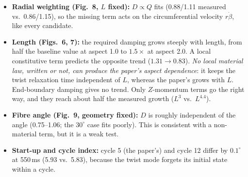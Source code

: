 \documentclass[10pt]{article}
\begin{document}
\begin{itemize}
\item \textbf{Radial weighting (Fig.~8, $L$ fixed):} $D\propto Q$ fits (0.88/1.11 measured vs.\
  0.86/1.15), so the missing term acts on the circumferential velocity $r\dot\beta$, like every candidate.
\item \textbf{Length (Figs.~6, 7):} the required damping grows steeply with length, from half the
  baseline value at aspect 1.0 to $1.5\times$ at aspect 2.0. A local constitutive term predicts
  the opposite trend ($1.31\to0.83$). \emph{No local material law, written or not, can
  produce the paper's aspect dependence}: it keeps the twist relaxation time independent of
  $L$, whereas the paper's grows with $L$. End-boundary damping gives no trend. Only
  $Z$-momentum terms go the right way, and they reach about half the measured growth
  ($L^3$ vs.\ $L^{4.4}$).
\item \textbf{Fibre angle (Fig.~9, geometry fixed):} $D$ is roughly independent of the angle
  (0.75--1.06; the $30^\circ$ case fits poorly). This is consistent with a non-material term, but
  it is a weak test.
\item \textbf{Start-up and cycle index:} cycle 5 (the paper's) and cycle 12 differ by
  $0.1^\circ$ at 550\,ms (5.93 vs.\ 5.83), because the twist mode forgets its initial state
  within a cycle.
\end{itemize}
\end{document}
